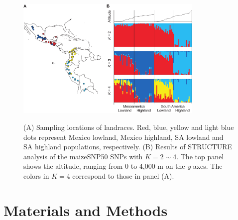 
\begin{figure}[tb]   
  \begin{center}
   \vspace{-0mm}
   \includegraphics[width=0.8\textwidth]{fig/Fig2}
   \renewcommand{\baselinestretch}{0.9}
   \vspace{-3mm}
   \caption{(A) Sampling locations of landraces.  Red, blue, yellow and light blue dots represent Mexico lowland, Mexico highland, SA lowland and SA highland populations, respectively.  (B) Results of {\sf STRUCTURE} analysis of the maizeSNP50 SNPs with $K=2\sim4$.  The top panel shows the altitude, ranging from 0 to 4,000 m on the \emph{y}-axes.  The colors in $K=4$ correspond to those in panel (A).    }
\vspace{-6mm}
    \label{map}
  \end{center}
\end{figure}


\section*{Materials and Methods}

